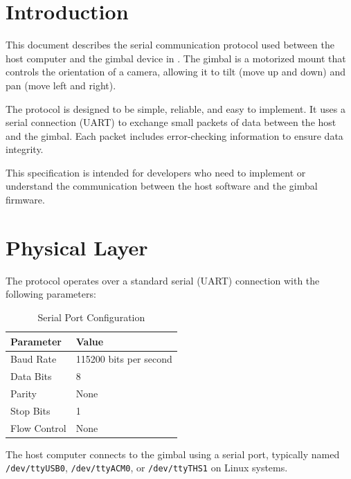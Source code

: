 \documentclass[12pt, titlepage]{article}
\begin{document}
\newpage

\tableofcontents

\newpage


\section{Introduction}

This document describes the serial communication protocol used between the host
computer and the gimbal device in \progname{}. The gimbal is a motorized mount
that controls the orientation of a camera, allowing it to tilt (move up and
down) and pan (move left and right).

The protocol is designed to be simple, reliable, and easy to implement. It uses
a serial connection (UART) to exchange small packets of data between the host
and the gimbal. Each packet includes error-checking information to ensure data
integrity.

This specification is intended for developers who need to implement or
understand the communication between the host software and the gimbal firmware.

\section{Physical Layer}

The protocol operates over a standard serial (UART) connection with the
following parameters:

\begin{table}[H]
  \centering
  \begin{tabular}{ll}
    \toprule
    \textbf{Parameter} & \textbf{Value}         \\
    \midrule
    Baud Rate          & 115200 bits per second \\
    Data Bits          & 8                      \\
    Parity             & None                   \\
    Stop Bits          & 1                      \\
    Flow Control       & None                   \\
    \bottomrule
  \end{tabular}
  \caption{Serial Port Configuration}
\end{table}

The host computer connects to the gimbal using a serial port, typically named
\texttt{/dev/ttyUSB0}, \texttt{/dev/ttyACM0}, or \texttt{/dev/ttyTHS1} on Linux
systems.
\end{document}
